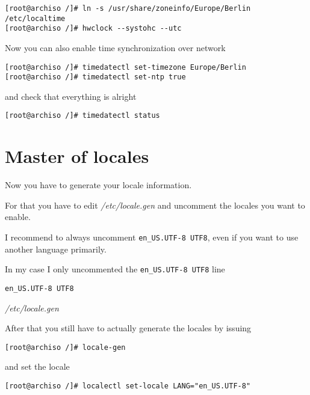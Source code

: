 \documentclass[10pt]{dustdoc}
\begin{document}
\begin{verbatim}
[root@archiso /]# ln -s /usr/share/zoneinfo/Europe/Berlin /etc/localtime
[root@archiso /]# hwclock --systohc --utc
\end{verbatim}

Now you can also enable time synchronization over network

\begin{verbatim}
[root@archiso /]# timedatectl set-timezone Europe/Berlin
[root@archiso /]# timedatectl set-ntp true
\end{verbatim}

\noindent
and check that everything is alright

\begin{verbatim}
[root@archiso /]# timedatectl status
\end{verbatim}

\section{Master of locales}
\label{sec:master-of-locales}

Now you have to generate your locale information.

For that you have to edit \textit{/etc/locale.gen} and uncomment the locales you want to enable.

\begin{NOTE}
    I recommend to always uncomment \texttt{en\_US.UTF-8 UTF8}, even if you want to use another language primarily.
\end{NOTE}

In my case I only uncommented the \texttt{en\_US.UTF-8 UTF8} line

\begin{mintedlisting}
    \begin{verbatim}
en_US.UTF-8 UTF8
    \end{verbatim}

    \caption{\textit{/etc/locale.gen}}
\end{mintedlisting}

After that you still have to actually generate the locales by issuing

\begin{verbatim}
[root@archiso /]# locale-gen
\end{verbatim}

\noindent
and set the locale

\begin{verbatim}
[root@archiso /]# localectl set-locale LANG="en_US.UTF-8"
\end{verbatim}
\end{document}
